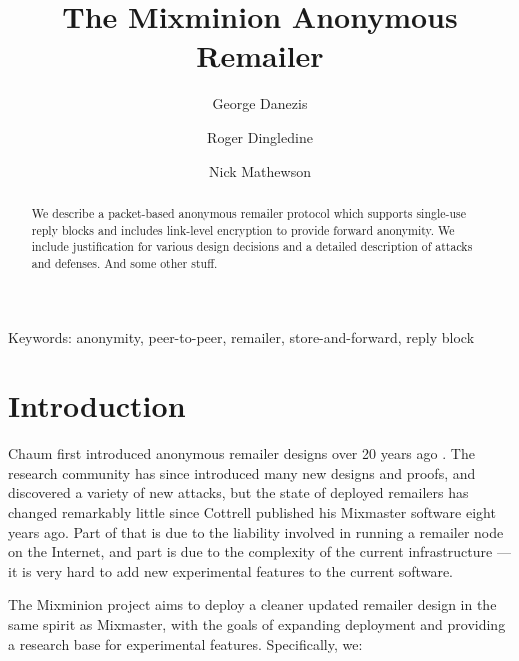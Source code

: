 \documentclass{llncs}
\begin{document}


\title{The Mixminion Anonymous Remailer}
\author{George Danezis \and Roger Dingledine \and Nick Mathewson}
\maketitle
\pagestyle{empty} 
  
\begin{abstract}

We describe a packet-based anonymous remailer protocol which supports
single-use reply blocks and includes link-level encryption to provide
forward anonymity. We include justification for various design decisions
and a detailed description of attacks and defenses. And some other stuff.

\end{abstract}

Keywords: anonymity, peer-to-peer, remailer, store-and-forward, reply block %


\section{Introduction}
\label{sec:intro}

Chaum first introduced anonymous remailer designs over 20 years ago
\cite{chaum-mix}. The research community has since introduced many
new designs and proofs, and discovered a variety of new attacks, but
the state of deployed remailers has changed remarkably little since
Cottrell published his Mixmaster software \cite{mixmaster-attacks} eight years
ago. Part of that is due to the liability involved in running a remailer
node on the Internet, and part is due to the complexity of the current
infrastructure --- it is very hard to add new experimental features
to the current software.

The Mixminion project aims to deploy a cleaner updated remailer design
in the same spirit as Mixmaster, with the goals of expanding deployment
and providing a research base for experimental features. Specifically, we:
\end{document}
